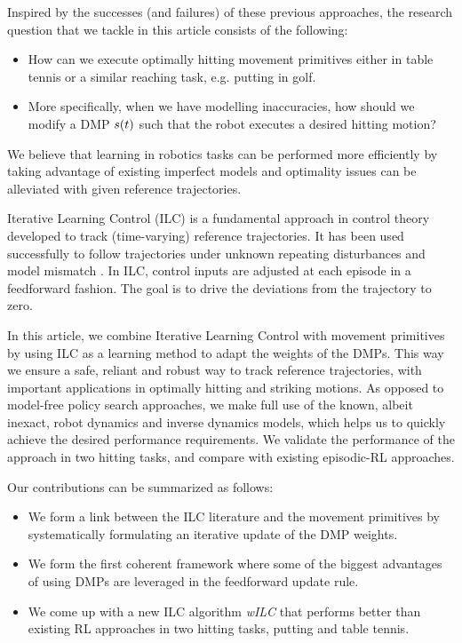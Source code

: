 Inspired by the successes (and failures) of these previous approaches, the research question that we tackle in this article consists of the following:

\begin{itemize}
\item How can we execute optimally hitting movement primitives either in table tennis or a similar reaching task, e.g. putting in golf.

\item More specifically, when we have modelling inaccuracies, how should we modify a DMP $s(t)$ such that the robot executes a desired hitting motion?
\end{itemize}

We believe that learning in robotics tasks can be performed more efficiently by taking advantage of existing imperfect models and optimality issues can be alleviated with given reference trajectories. 

Iterative Learning Control (ILC) is a fundamental approach in control theory developed to track (time-varying) reference trajectories. It has been used successfully to follow trajectories under unknown repeating disturbances and model mismatch \cite{Bristow06}. In ILC, control inputs are adjusted at each episode in a feedforward fashion. The goal is to drive the deviations from the trajectory to zero. 

In this article, we combine Iterative Learning Control with movement primitives by using ILC as a learning method to adapt the weights of the DMPs. This way we ensure a safe, reliant and robust way to track reference trajectories, with important applications in optimally hitting and striking motions. As opposed to model-free policy search approaches, we make full use of the known, albeit inexact, robot dynamics and inverse dynamics models, which helps us to quickly achieve the desired performance requirements. We validate the performance of the approach in two hitting tasks, and compare with existing episodic-RL approaches.

Our contributions can be summarized as follows:

\begin{itemize}
\item We form a link between the ILC literature and the movement primitives by systematically formulating an iterative update of the DMP weights.

\item We form the first coherent framework where some of the biggest advantages of using DMPs are leveraged in the feedforward update rule.

\item We come up with a new ILC algorithm \emph{wILC} that performs better than existing RL approaches in two hitting tasks, putting and table tennis.

\end{itemize}

